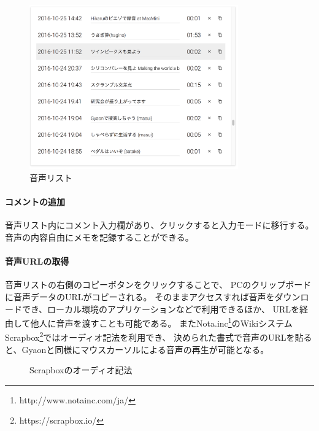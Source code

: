 \begin{figure}[H]
\centering
\includegraphics[width=9cm]{images/list.png}
\caption{音声リスト}
\label{list}
\end{figure}

\paragraph{コメントの追加}
    音声リスト内にコメント入力欄があり、クリックすると入力モードに移行する。
    音声の内容自由にメモを記録することができる。

\paragraph{音声URLの取得}
    音声リストの右側のコピーボタンをクリックすることで、
    PCのクリップボードに音声データのURLがコピーされる。
    そのままアクセスすれば音声をダウンロードでき、ローカル環境のアプリケーションなどで利用できるほか、
    URLを経由して他人に音声を渡すことも可能である。
    またNota.inc\footnote{\textsf{http://www.notainc.com/ja/}}のWikiシステム
    Scrapbox\footnote{\textsf{https://scrapbox.io/}}ではオーディオ記法を利用でき、
    決められた書式で音声のURLを貼ると、Gyaonと同様にマウスカーソルによる音声の再生が可能となる。

\begin{figure}[H]
\centering
{}
\caption{Scrapboxのオーディオ記法}
\label{scrapbox}
\end{figure}

